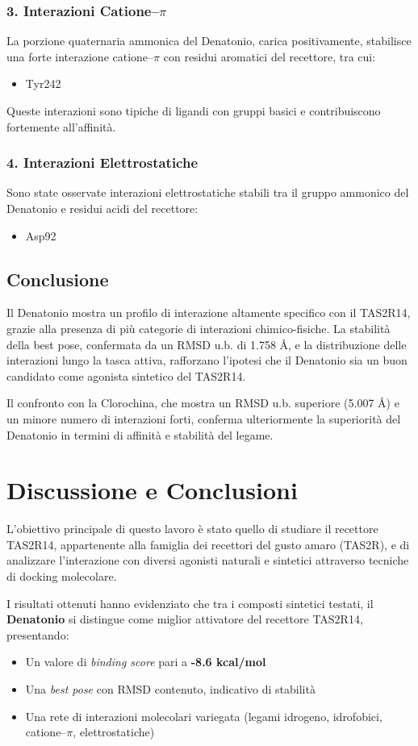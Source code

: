 \documentclass[12pt, a4paper]{book}
\begin{document}
\subsection*{3. Interazioni Catione–$\pi$}
La porzione quaternaria ammonica del Denatonio, carica positivamente, stabilisce una forte interazione catione–$\pi$ con residui aromatici del recettore, tra cui:
\begin{itemize}
    \item Tyr242
\end{itemize}

Queste interazioni sono tipiche di ligandi con gruppi basici e contribuiscono fortemente all’affinità.

\subsection*{4. Interazioni Elettrostatiche}
Sono state osservate interazioni elettrostatiche stabili tra il gruppo ammonico del Denatonio e residui acidi del recettore:
\begin{itemize}
    \item Asp92
\end{itemize}
\newpage
\section*{Conclusione}
Il Denatonio mostra un profilo di interazione altamente specifico con il TAS2R14, grazie alla presenza di più categorie di interazioni chimico-fisiche. La stabilità della best pose, confermata da un RMSD u.b. di 1.758 Å, e la distribuzione delle interazioni lungo la tasca attiva, rafforzano l’ipotesi che il Denatonio sia un buon candidato come agonista sintetico del TAS2R14.

Il confronto con la Clorochina, che mostra un RMSD u.b. superiore (5.007 Å) e un minore numero di interazioni forti, conferma ulteriormente la superiorità del Denatonio in termini di affinità e stabilità del legame.
\newpage
\chapter{Discussione e Conclusioni}

L’obiettivo principale di questo lavoro è stato quello di studiare il recettore TAS2R14, appartenente alla famiglia dei recettori del gusto amaro (TAS2R), e di analizzare l’interazione con diversi agonisti naturali e sintetici attraverso tecniche di docking molecolare.

I risultati ottenuti hanno evidenziato che tra i composti sintetici testati, il \textbf{Denatonio} si distingue come miglior attivatore del recettore TAS2R14, presentando:
\begin{itemize}
    \item Un valore di \textit{binding score} pari a \textbf{-8.6 kcal/mol}
    \item Una \textit{best pose} con RMSD contenuto, indicativo di stabilità
    \item Una rete di interazioni molecolari variegata (legami idrogeno, idrofobici, catione–$\pi$, elettrostatiche)
\end{itemize}
\end{document}
